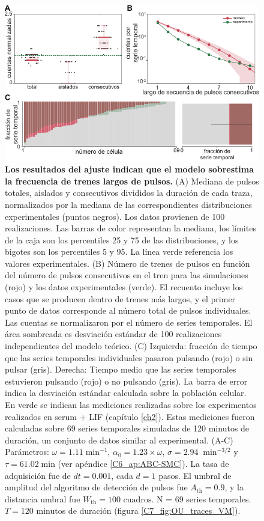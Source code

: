 \documentclass[./main.tex]{subfiles}
\begin{document}
\begin{figure}
    \centering
    \includegraphics[width=1\columnwidth]{figures/chapter7/C7_OU_validation.pdf} 
    \caption{\textbf{Los resultados del ajuste indican que el modelo sobrestima la frecuencia de trenes largos de pulsos.} (A) Mediana de pulsos totales, aislados y consecutivos divididos la duración de cada traza, normalizados por la mediana de las correspondientes distribuciones experimentales (puntos negros). Los datos provienen de 100 realizaciones. Las barras de color representan la mediana, los límites de la caja son los percentiles 25 y 75 de las distribuciones, y los bigotes son los percentiles 5 y 95. La línea verde referencia los valores experimentales. (B) Número de trenes de pulsos en función del número de pulsos consecutivos en el tren para las simulaciones (rojo) y los datos experimentales (verde). El recuento incluye los casos que se producen dentro de trenes más largos, y el primer punto de datos corresponde al número total de pulsos individuales. Las cuentas se normalizaron por el número de series temporales. El área sombreada es desviación estándar de 100 realizaciones independientes del modelo teórico. (C) Izquierda: fracción de tiempo que las series temporales individuales pasaron pulsando (rojo) o sin pulsar (gris). Derecha: Tiempo medio que las series temporales estuvieron pulsando (rojo) o no pulsando (gris). La barra de error indica la desviación estándar calculada sobre la población celular. En verde se indican las mediciones realizadas sobre los experimentos realizados en serum + LIF (capítulo \ref{ch2}). Estas mediciones fueron calculadas sobre 69 series temporales simuladas de 120 minutos de duración, un conjunto de datos similar al experimental. (A-C) Parámetros: $\omega = 1.11 \; \text{min}^{-1}$, $\alpha_0 = 1.23 \times \omega$, $ \sigma = 2.94 \; \; \text{min}^{-3/2}$ y $\tau = 61.02 \; \text{min} $ (ver apéndice \ref{C6_ap:ABC-SMC}). La tasa de adquisición fue de $dt = 0.001$, cada $d = 1$ pasos. El umbral de amplitud del algoritmo de detección de pulsos fue $A_{\text{th}} = 0.9$, y la distancia umbral fue $W_{\text{th}} = 100\text{ cuadros}$. N = $69$ series temporales. $T = 120$ minutos de duración (figura \ref{C7_fig:OU_traces_VM}).}
    \label{C7_fig:OU_param_evaluation}
\end{figure} 
\end{document}
